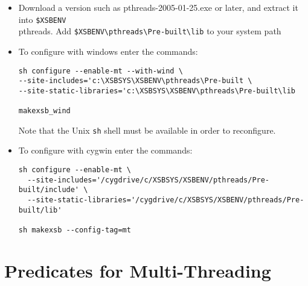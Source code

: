 \begin{itemize}
\item Download a version such as pthreads-2005-01-25.exe or later, and
  extract it into {\tt \$XSBENV}\\pthreads.  Add
  \verb|$XSBENV\pthreads\Pre-built\lib| to your system path

\item To configure with windows enter the commands: 
\begin{verbatim}
sh configure --enable-mt --with-wind \
--site-includes='c:\XSBSYS\XSBENV\pthreads\Pre-built \
--site-static-libraries='c:\XSBSYS\XSBENV\pthreads\Pre-built\lib

makexsb_wind
\end{verbatim}
Note that the Unix {\tt sh} shell must be available in order to
reconfigure.

\item To configure with cygwin enter the commands:
\begin{verbatim}
sh configure --enable-mt \
  --site-includes='/cygdrive/c/XSBSYS/XSBENV/pthreads/Pre-built/include' \
  --site-static-libraries='/cygdrive/c/XSBSYS/XSBENV/pthreads/Pre-built/lib'

sh makexsb --config-tag=mt
\end{verbatim}

\end{itemize}

\section{Predicates for Multi-Threading} \label{sec:mt-threading}

